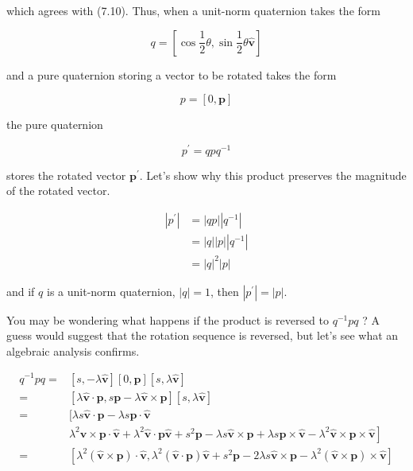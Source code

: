 which agrees with (7.10). Thus, when a unit-norm quaternion takes the form

$$
q=\left[\cos \frac{1}{2} \theta, \sin \frac{1}{2} \theta \hat{\mathbf{v}}\right]
$$

and a pure quaternion storing a vector to be rotated takes the form

$$
p=[0, \mathbf{p}]
$$

the pure quaternion

$$
p^{\prime}=q p q^{-1}
$$

stores the rotated vector $\mathbf{p}^{\prime}$. Let's show why this product preserves the magnitude of the rotated vector.

$$
\begin{aligned}
\left|p^{\prime}\right| & =|q p|\left|q^{-1}\right| \\
& =|q||p|\left|q^{-1}\right| \\
& =|q|^{2}|p|
\end{aligned}
$$

and if $q$ is a unit-norm quaternion, $|q|=1$, then $\left|p^{\prime}\right|=|p|$.

You may be wondering what happens if the product is reversed to $q^{-1} p q$ ? A guess would suggest that the rotation sequence is reversed, but let's see what an algebraic analysis confirms.

$$
\begin{aligned}
q^{-1} p q= & {[s,-\lambda \hat{\mathbf{v}}][0, \mathbf{p}][s, \lambda \hat{\mathbf{v}}] } \\
= & {[\lambda \hat{\mathbf{v}} \cdot \mathbf{p}, s \mathbf{p}-\lambda \hat{\mathbf{v}} \times \mathbf{p}][s, \lambda \hat{\mathbf{v}}] } \\
= & {[\lambda s \hat{\mathbf{v}} \cdot \mathbf{p}-\lambda s \mathbf{p} \cdot \hat{\mathbf{v}}} \\
& \left.\lambda^{2} \hat{\mathbf{v}} \times \mathbf{p} \cdot \hat{\mathbf{v}}+\lambda^{2} \hat{\mathbf{v}} \cdot \mathbf{p} \hat{\mathbf{v}}+s^{2} \mathbf{p}-\lambda s \hat{\mathbf{v}} \times \mathbf{p}+\lambda s \mathbf{p} \times \hat{\mathbf{v}}-\lambda^{2} \hat{\mathbf{v}} \times \mathbf{p} \times \hat{\mathbf{v}}\right] \\
= & {\left[\lambda^{2}(\hat{\mathbf{v}} \times \mathbf{p}) \cdot \hat{\mathbf{v}}, \lambda^{2}(\hat{\mathbf{v}} \cdot \mathbf{p}) \hat{\mathbf{v}}+s^{2} \mathbf{p}-2 \lambda s \hat{\mathbf{v}} \times \mathbf{p}-\lambda^{2}(\hat{\mathbf{v}} \times \mathbf{p}) \times \hat{\mathbf{v}}\right] }
\end{aligned}
$$

